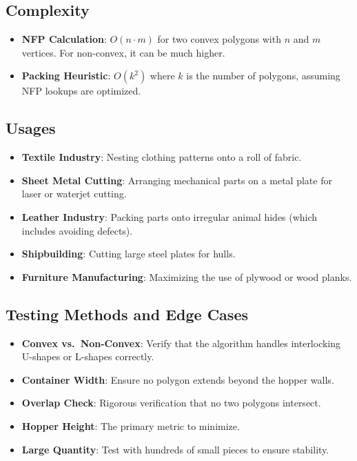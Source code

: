 \subsection{Complexity}
\begin{itemize}
    \item \textbf{NFP Calculation}: $O(n \cdot m)$ for two convex polygons with $n$ and $m$ vertices. For non-convex, it can be much higher.
    \item \textbf{Packing Heuristic}: $O(k^2)$ where $k$ is the number of polygons, assuming NFP lookups are optimized.
\end{itemize}

\subsection{Usages}
\begin{itemize}
    \item \textbf{Textile Industry}: Nesting clothing patterns onto a roll of fabric.
    \item \textbf{Sheet Metal Cutting}: Arranging mechanical parts on a metal plate for laser or waterjet cutting.
    \item \textbf{Leather Industry}: Packing parts onto irregular animal hides (which includes avoiding defects).
    \item \textbf{Shipbuilding}: Cutting large steel plates for hulls.
    \item \textbf{Furniture Manufacturing}: Maximizing the use of plywood or wood planks.
\end{itemize}

\subsection{Testing Methods and Edge Cases}
\begin{itemize}
    \item \textbf{Convex vs.\ Non-Convex}: Verify that the algorithm handles interlocking U-shapes or L-shapes correctly.
    \item \textbf{Container Width}: Ensure no polygon extends beyond the hopper walls.
    \item \textbf{Overlap Check}: Rigorous verification that no two polygons intersect.
    \item \textbf{Hopper Height}: The primary metric to minimize.
    \item \textbf{Large Quantity}: Test with hundreds of small pieces to ensure stability.
\end{itemize}

